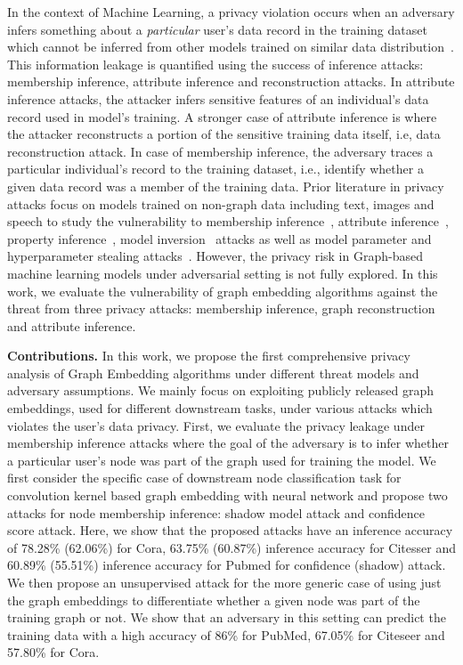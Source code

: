 In the context of Machine Learning, a privacy violation occurs when an adversary infers something about a \textit{particular} user's data record in the training dataset which cannot be inferred from other models trained on similar data distribution~\cite{membershipinf,whitebox}.
This information leakage is quantified using the success of inference attacks: membership inference, attribute inference and reconstruction attacks.
In attribute inference attacks, the attacker infers sensitive features of an individual's data record used in model's training.
A stronger case of attribute inference is where the attacker reconstructs a portion of the sensitive training data itself, i.e, data reconstruction attack.
In case of membership inference, the adversary traces a particular individual's record to the training dataset, i.e., identify whether a given data record was a member of the training data.
Prior literature in privacy attacks focus on models trained on non-graph data including text, images and speech to study the vulnerability to membership inference~\cite{ndss19salem,membershipinf}, attribute inference~\cite{attributeinf,attributeinf2}, property inference~\cite{propertyinf}, model inversion~\cite{modelinversion} attacks as well as model parameter and hyperparameter stealing attacks~\cite{timing,stealml,8418595}.
However, the privacy risk in Graph-based machine learning models under adversarial setting is not fully explored.
In this work, we evaluate the vulnerability of graph embedding algorithms against the threat from three privacy attacks: membership inference, graph reconstruction and attribute inference.

\noindent\textbf{Contributions.} In this work, we propose the first comprehensive privacy analysis of Graph Embedding algorithms under different threat models and adversary assumptions.
We mainly focus on exploiting publicly released graph embeddings, used for different downstream tasks, under various attacks which violates the user's data privacy.
First, we evaluate the privacy leakage under membership inference attacks where the goal of the adversary is to infer whether a particular user's node was part of the graph used for training the model.
We first consider the specific case of downstream node classification task for convolution kernel based graph embedding with neural network and propose two attacks for node membership inference: shadow model attack and confidence score attack.
Here, we show that the proposed attacks have an inference accuracy of 78.28\% (62.06\%) for Cora, 63.75\% (60.87\%) inference accuracy for Citesser and 60.89\% (55.51\%) inference accuracy for Pubmed for confidence (shadow) attack.
We then propose an unsupervised attack for the more generic case of using just the graph embeddings to differentiate whether a given node was part of the training graph or not.
We show that an adversary in this setting can predict the training data with a high accuracy of 86\% for PubMed, 67.05\% for Citeseer and 57.80\% for Cora.


